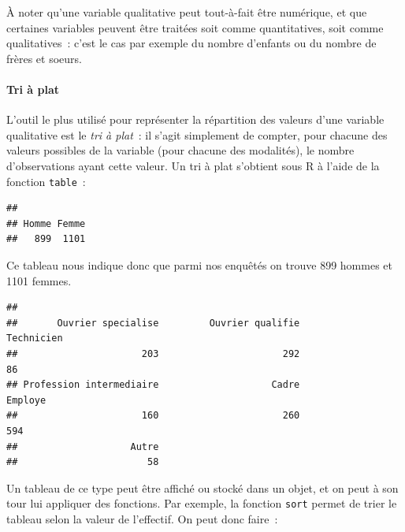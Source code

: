 \documentclass[12pt,]{book}
\newenvironment{Shaded}{\begin{snugshade}}{\end{snugshade}}
\newcommand{\KeywordTok}[1]{\textcolor[rgb]{0.13,0.29,0.53}{\textbf{#1}}}
\newcommand{\NormalTok}[1]{#1}
\newcommand{\OperatorTok}[1]{\textcolor[rgb]{0.81,0.36,0.00}{\textbf{#1}}}
\let\oldparagraph\paragraph
\renewcommand{\paragraph}[1]{\oldparagraph{#1}\mbox{}}
\begin{document}
À noter qu'une variable qualitative peut tout-à-fait être numérique, et que certaines variables peuvent être traitées soit comme quantitatives, soit comme qualitatives~: c'est le cas par exemple du nombre d'enfants ou du nombre de frères et soeurs.

\hypertarget{tri-uxe0-plat}{%
\paragraph{Tri à plat}\label{tri-uxe0-plat}}

L'outil le plus utilisé pour représenter la répartition des valeurs d'une variable qualitative est le \emph{tri à plat}~: il s'agit simplement de compter, pour chacune des valeurs possibles de la variable (pour chacune des modalités), le nombre d'observations ayant cette valeur. Un tri à plat s'obtient sous R à l'aide de la fonction \texttt{table}~:

\begin{Shaded}
\end{Shaded}

\begin{verbatim}
## 
## Homme Femme 
##   899  1101
\end{verbatim}

Ce tableau nous indique donc que parmi nos enquêtés on trouve 899 hommes et 1101 femmes.

\begin{Shaded}
\end{Shaded}

\begin{verbatim}
## 
##       Ouvrier specialise         Ouvrier qualifie               Technicien 
##                      203                      292                       86 
## Profession intermediaire                    Cadre                  Employe 
##                      160                      260                      594 
##                    Autre 
##                       58
\end{verbatim}

Un tableau de ce type peut être affiché ou stocké dans un objet, et on peut à son tour lui appliquer des fonctions. Par exemple, la fonction \texttt{sort} permet de trier le tableau selon la valeur de l'effectif. On peut donc faire~:
\end{document}
